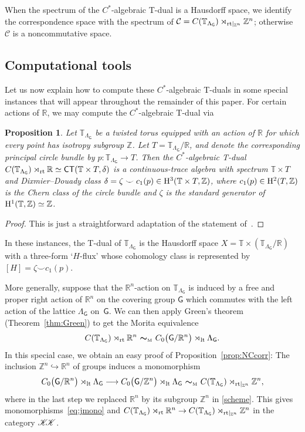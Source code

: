 \documentclass[pdftex]{sigma}
\numberwithin{equation}{section}
\newcommand{\C}{\complex}
\newcommand{\Z}{\zed}
\newcommand{\mbf}[1]{{\boldsymbol {#1} }}
\def\T{{\sf T}}
\def\C{{\sf C}}
\newcommand{\CCK}{\mathscr{K}}
\newcommand{\Ccal}{\mathcal{C}}
\newcommand{\sfG}{\mathsf{G}}
\newcommand{\rmH}{{\rm H}}
\newcommand{\lt}{{\rm lt}}
\newcommand{\rt}{{\rm rt}}
\newcommand{\R}{\real}
\newcommand{\complex}{{\mathbb C}} %
\newcommand{\zed}{{\mathbb Z}} %
\newcommand{\real}{{\mathbb R}} %
\newcommand{\torus}{{\mathbb T}} %
\newtheorem{Proposition}[Theorem]{Proposition}
 { \theoremstyle{definition}
\newtheorem{Definition}[Theorem]{Definition}
\newtheorem{Note}[Theorem]{Note}
\newtheorem{Example}[Theorem]{Example}
\newtheorem{Remark}[Theorem]{Remark} }
\begin{document}
When the spectrum of the
$C^*$-algebraic T-dual is a Hausdorff space, we identify the
correspondence space with the spectrum of
$\Ccal=C(\torus_{\Lambda_\sfG})\rtimes_{\rt|_{\zed^n}}\zed^n$;
otherwise $\Ccal$ is a noncommutative space.

\subsection{Computational tools}

Let us now explain how to compute these $C^*$-algebraic T-duals in
some special instances that will appear throughout the remainder of
this paper. For certain actions of $\real$, we
may compute the $C^*$-algebraic T-dual via
\begin{Proposition}\label{prop:Raeburn}
Let $\torus_{\Lambda_\sfG}$ be a twisted torus equipped with an action of
$\real$ for which every point has isotropy subgroup $\zed$. Let
$T=\torus_{\Lambda_\sfG}/\real$, and denote the corresponding principal
circle bundle by $p\colon \torus_{\Lambda_\sfG}\to T$. Then the $C^*$-algebraic
T-dual $C(\torus_{\Lambda_\sfG})\rtimes_\rt \real\simeq \C\T(\torus\times T,\delta)$ is a continuous-trace
algebra with spectrum $\torus\times T$ and Dixmier--Douady class
$\delta = \zeta\smile c_1(p)\in \rmH^3(\torus\times T,\Z)$, where
$c_1(p) \in \rmH^2(T,\Z)$ is the Chern class of the circle bundle and $\zeta$ is the
standard generator of $\rmH^1(\torus,\Z)\simeq\Z$.
\end{Proposition}
\begin{proof}
This is just a straightforward adaptation of the statement
of~\cite [Proposition~4.5]{Raeburn1988}.
\end{proof}

In these instances, the T-dual of $\torus_{\Lambda_\sfG}$ is the Hausdorff space $X=\torus\times
(\torus_{\Lambda_\sfG}/\real)$ with a three-form `$H$-flux' whose cohomology class is
represented by $[H] = \zeta\smile c_1(p)$.

More generally, suppose that the $\real^n$-action on $\torus_{\Lambda_\sfG}$ is
induced by a free and proper right action of $\real^n$ on the covering group $\sfG$
which commutes with the left action of the lattice $\Lambda_\sfG$ on~$\sfG$. We can then apply Green's theorem
(Theorem~\ref{thm:Green}) to get the Morita
equivalence
\begin{gather}\label{scheme}
C(\torus_{\Lambda_\sfG})\rtimes_\rt \real^n \ \mbf\sim_{\text{\tiny M}} \
C_0\big(\sfG/\real^n\big)\rtimes_\lt \Lambda_\sfG .
\end{gather}
In this special case, we obtain an easy proof of
Proposition~\ref{prop:NCcorr}: The inclusion
$\Z^n\hookrightarrow\R^n$ of groups induces a monomorphism
\[
C_0\big(\sfG/\real^n\big)\rtimes_\lt \Lambda_\sfG \longrightarrow
C_0\big(\sfG/\Z^n\big)\rtimes_\lt \Lambda_\sfG \ \mbf\sim_{\text{\tiny M}}
 \ C(\torus_{\Lambda_\sfG})\rtimes_{\rt|_{\Z^n}} \Z^n ,
\]
where in the last step we replaced $\R^n$ by its subgroup $\Z^n$ in
\eqref{scheme}. This gives monomor\-phisms~\eqref{eq:jmono} and
$C(\torus_{\Lambda_\sfG})\rtimes_\rt \real^n\to
C(\torus_{\Lambda_\sfG})\rtimes_{\rt|_{\Z^n}} \Z^n$ in the category
$\CCK\hspace{-1mm}\CCK$.
\end{document}
